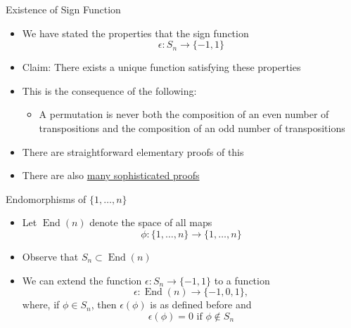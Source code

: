 \documentclass[usenames,dvipsnames,10pt]{beamer}
\newcommand{\End}{\operatorname{End}}
\begin{document}
\begin{frame}
  {Existence of Sign Function}

  \begin{itemize}
  \item We have stated the properties that the sign function
    \[ \epsilon: S_n \rightarrow \{-1,1\} \]
  \item Claim: There exists a unique function satisfying these properties
  \item This is the consequence of the following:
    \begin{itemize}
    \item A permutation is never both the composition of an even number of transpositions and the composition of an odd number of transpositions
    \end{itemize}
  \item There are straightforward elementary proofs of this
  \item There are also \href{https://mathoverflow.net/questions/417690/conceptual-reason-why-the-sign-of-a-permutation-is-well-defined}{many sophisticated proofs}
  \end{itemize}
\end{frame}

\begin{frame}
  {Endomorphisms of $\{1, \dots, n\}$}

  \begin{itemize}
  \item Let $\End(n)$ denote the space of all maps
    \[
      \phi: \{1, \dots, n\} \rightarrow \{1, \dots, n\}
    \]
  \item Observe that $S_n \subset \End(n)$
  \item We can extend the function $\epsilon: S_n \rightarrow \{-1,1\}$ to a function
    \[
      \epsilon: \End(n) \rightarrow \{-1,0,1\},
    \]
    where, if $\phi \in S_n$, then $\epsilon(\phi)$ is as defined before and
    \[
      \epsilon(\phi) = 0\text{ if }\phi \notin S_n
    \]
  \end{itemize}
\end{frame}
\end{document}
